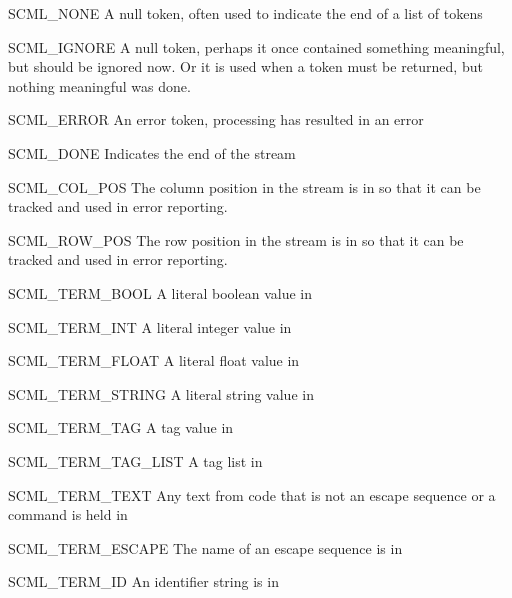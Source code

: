 \begin{cidentifierlist}
  \item[SCML_NONE]
  A null token, often used to indicate the end of a list of tokens

  \item[SCML_IGNORE]
  A null token, perhaps it once contained something meaningful, but should
  be ignored now.  Or it is used when a token must be returned, but nothing
  meaningful was done.

  \item[SCML_ERROR]
  An error token, processing has resulted in an error

  \item[SCML_DONE]
  Indicates the end of the stream

  \item[SCML_COL_POS]
  The column position in the stream is in  so that it can
  be tracked and used in error reporting.

  \item[SCML_ROW_POS]
  The row position in the stream is in  so that it can
  be tracked and used in error reporting.

  \item[SCML_TERM_BOOL]
  A literal boolean value in 

  \item[SCML_TERM_INT]
  A literal integer value in 

  \item[SCML_TERM_FLOAT]
  A literal float value in 

  \item[SCML_TERM_STRING]
  A literal string value in 

  \item[SCML_TERM_TAG]
  A tag value in 

  \item[SCML_TERM_TAG_LIST]
  A tag list in 

  \item[SCML_TERM_TEXT]
  Any text from \SCML{} code that is not an escape sequence or a command is held
  in 

  \item[SCML_TERM_ESCAPE]
  The name of an escape sequence is in 

  \item[SCML_TERM_ID]
  An identifier string is in 


\end{cidentifierlist}
